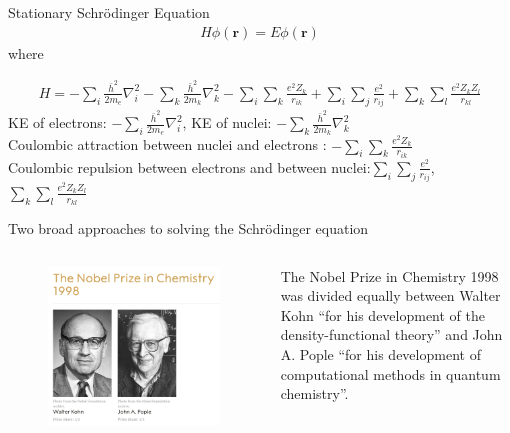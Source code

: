 \documentclass[aspectratio=169]{beamer}
\let \vec \mathbf
\begin{document}
\begin{frame}{Stationary Schr\"odinger Equation}
\begin{eqnarray*}
    H\phi(\vec{r}) = E\phi(\vec{r}) 
\end{eqnarray*}
where

\begin{eqnarray*}
    H = -\sum_i \frac{\bar{h}^2}{2m_e}\nabla_i^2
    -\sum_k \frac{\bar{h}^2}{2m_k}\nabla_k^2
    -\sum_i\sum_k \frac{e^2Z_k}{r_{ik}}
    +\sum_i\sum_j \frac{e^2}{r_{ij}}
    +\sum_k\sum_l \frac{e^2Z_kZ_l}{r_{kl}}
\end{eqnarray*}
    KE of electrons: $-\sum_i \frac{\bar{h}^2}{2m_e}\nabla_i^2$, KE of nuclei: $-\sum_k \frac{\bar{h}^2}{2m_k}\nabla_k^2$\\
    Coulombic attraction between nuclei and electrons : $-\sum_i\sum_k \frac{e^2Z_k}{r_{ik}}$\\
    Coulombic repulsion between electrons and between nuclei:$\sum_i\sum_j \frac{e^2}{r_{ij}}$, $\sum_k\sum_l \frac{e^2Z_kZ_l}{r_{kl}}$

\end{frame}

\begin{frame}{Two broad approaches to solving the Schr\"odinger equation}
\begin{columns}
    \begin{figure}
        \centering
        \includegraphics[width=0.9\linewidth]{lectures/figures/1_nobelprizes.png}
    \end{figure}
    The Nobel Prize in Chemistry 1998 was divided equally between Walter Kohn ``for his development of the density-functional theory'' and John A. Pople ``for his development of computational methods in quantum chemistry''.
    
\end{columns}
    
\end{frame}
\end{document}
